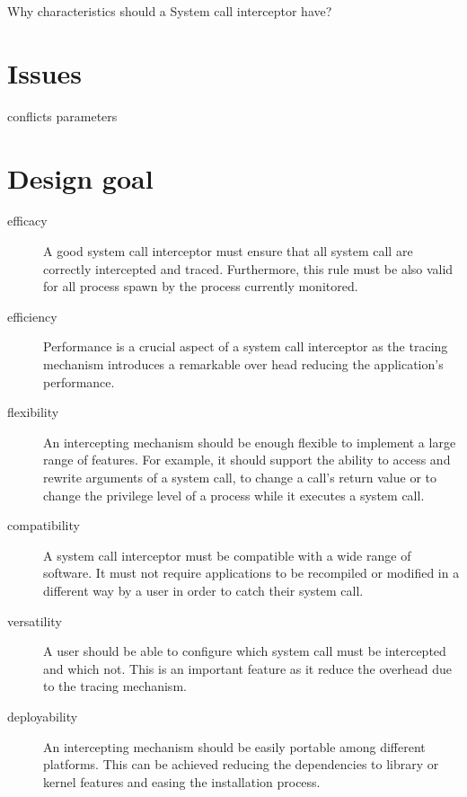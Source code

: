 Why characteristics should a System call interceptor have? 

\section{Issues}
conflicts parameters


\section{Design goal} 

\begin{description}


\item[efficacy]  A good system call interceptor must ensure that all system call are correctly intercepted and traced. Furthermore, this rule must be also valid for all process  spawn by the process currently monitored.  

\item[efficiency]Performance is a crucial aspect of a system call interceptor as the tracing mechanism introduces a remarkable over head reducing the application's performance. %

\item[flexibility] An intercepting mechanism should be enough flexible to implement a large range of features. For example, it should support the ability to access and rewrite arguments of a system call, to change a call's return value or to change the privilege level of a process while it executes a system call. 

\item[compatibility] A system call interceptor must be compatible with a wide range of software. It must not require applications to be recompiled or modified in a different way by a user in order to catch their system call. 

\item[versatility] A user should be able to configure which system call must be intercepted and which not. This is an important feature as it reduce the overhead due to the tracing mechanism. 

\item[deployability] An intercepting mechanism should be easily portable among different platforms. This can be achieved reducing the dependencies to library or kernel features and easing the installation process.  



\end{description}


